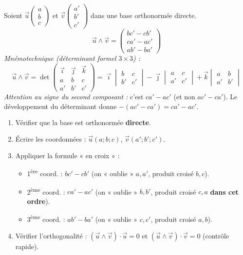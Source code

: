 \documentclass[11pt]{article}
\begin{document}
\begin{propriete}
Soient $\vec{u}\begin{pmatrix}a\\b\\c\end{pmatrix}$ et $\vec{v}\begin{pmatrix}a'\\b'\\c'\end{pmatrix}$ dans une base orthonormée directe.
\[
\vec{u}\wedge\vec{v} = \begin{pmatrix}
bc' - cb' \\
ca' - ac' \\
ab' - ba'
\end{pmatrix}
\]
\emph{Mnémotechnique (déterminant formel $3\times 3$) :}
\[
\vec{u}\wedge\vec{v} = \det\begin{pmatrix}
\vec{\imath} & \vec{\jmath} & \vec{k} \\
a & b & c \\
a' & b' & c'
\end{pmatrix}
= \vec{\imath}\begin{vmatrix}b&c\\b'&c'\end{vmatrix}
- \vec{\jmath}\begin{vmatrix}a&c\\a'&c'\end{vmatrix}
+ \vec{k}\begin{vmatrix}a&b\\a'&b'\end{vmatrix}
\]
\emph{Attention au signe du second composant :} c'est $ca'-ac'$ (et non $ac'-ca'$). Le développement du déterminant donne $-(ac'-ca') = ca'-ac'$.
\end{propriete}

\begin{methode}
\begin{enumerate}
  \item Vérifier que la base est orthonormée \textbf{directe}.
  \item Écrire les coordonnées : $\vec{u}(a;b;c)$, $\vec{v}(a';b';c')$.
  \item Appliquer la formule « en croix » :
  \begin{itemize}
    \item 1\textsuperscript{ère} coord. : $b c' - c b'$ (on « oublie » $a,a'$, produit croisé $b,c$).
    \item 2\textsuperscript{ème} coord. : $c a' - a c'$ (on « oublie » $b,b'$, produit croisé $c,a$ \textbf{dans cet ordre}).
    \item 3\textsuperscript{ème} coord. : $a b' - b a'$ (on « oublie » $c,c'$, produit croisé $a,b$).
  \end{itemize}
  \item Vérifier l'orthogonalité : $(\vec{u}\wedge\vec{v})\cdot\vec{u}=0$ et $(\vec{u}\wedge\vec{v})\cdot\vec{v}=0$ (contrôle rapide).
\end{enumerate}
\end{methode}
\end{document}
